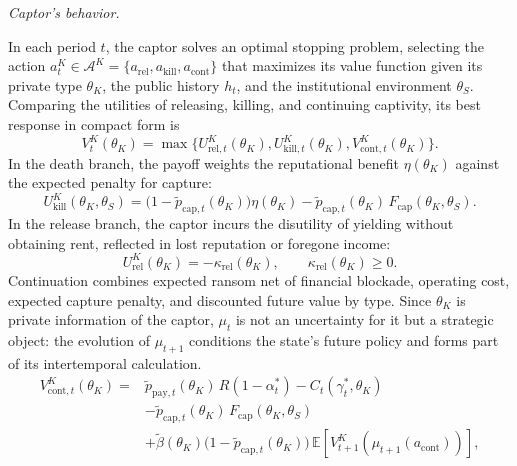 \documentclass[review,authoryear,12pt]{elsarticle}
\theoremstyle{plain}
\theoremstyle{definition}
\newcommand{\E}{\mathbb{E}}
\newcommand{\1}{\mathbf{1}}
\begin{document}
\noindent\textit{Captor's behavior.}

\noindent In each period $t$, the captor solves an optimal stopping problem, selecting the action $a_t^K\in\mathcal{A}^K=\{a_{\mathrm{rel}},a_{\mathrm{kill}},a_{\mathrm{cont}}\}$ that maximizes its value function given its private type $\theta_K$, the public history $h_t$, and the institutional environment $\theta_S$. Comparing the utilities of releasing, killing, and continuing captivity, its best response in compact form is
\begin{equation}
V^K_t(\theta_K)=
\max\{U^K_{\mathrm{rel},t}(\theta_K),
U^K_{\mathrm{kill},t}(\theta_K),
V^K_{\mathrm{cont},t}(\theta_K)\}.
\label{eq:k-bellman}
\end{equation}
In the death branch, the payoff weights the reputational benefit $\eta(\theta_K)$ against the expected penalty for capture:
\begin{equation}
U^K_{\mathrm{kill}}(\theta_K,\theta_S)=\bigl(1-\tilde{p}_{\mathrm{cap},t}(\theta_K)\bigr)\eta(\theta_K)-\tilde{p}_{\mathrm{cap},t}(\theta_K)\,F_{\mathrm{cap}}(\theta_K,\theta_S).
\label{eq:k-kill}
\end{equation}
In the release branch, the captor incurs the disutility of yielding without obtaining rent, reflected in lost reputation or foregone income:
\begin{equation}
U^K_{\mathrm{rel}}(\theta_K)=-\kappa_{\mathrm{rel}}(\theta_K),\qquad\kappa_{\mathrm{rel}}(\theta_K)\ge 0.
\label{eq:k-rel}
\end{equation}
Continuation combines expected ransom net of financial blockade, operating cost, expected capture penalty, and discounted future value by type. Since $\theta_K$ is private information of the captor, $\mu_t$ is not an uncertainty for it but a strategic object: the evolution of $\mu_{t+1}$ conditions the state's future policy and forms part of its intertemporal calculation.
\begin{equation}
\begin{aligned}
V^K_{\mathrm{cont},t}(\theta_K)
={}&\tilde{p}_{\mathrm{pay},t}(\theta_K)\,R(1-\alpha_t^\ast)
-C_t(\gamma_t^\ast,\theta_K)\\
&-\tilde{p}_{\mathrm{cap},t}(\theta_K)\,F_{\mathrm{cap}}(\theta_K,\theta_S)\\
&+\tilde{\beta}(\theta_K)\bigl(1-\tilde{p}_{\mathrm{cap},t}(\theta_K)\bigr)\,\E\!\left[V^K_{t+1}\!\left(\mu_{t+1}(a_{\mathrm{cont}})\right)\right],
\end{aligned}
\label{eq:kidnapper-cont}
\end{equation}
\end{document}
